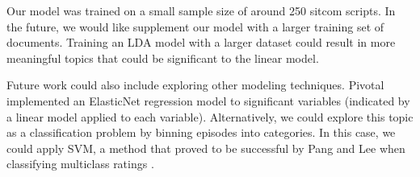 \documentclass{sig-alternate-05-2015}
\begin{document}
Our model was trained on a small sample size of around 250 sitcom scripts. In the future, we would like supplement our model with a larger training set of documents. Training an LDA model with a larger dataset could result in more meaningful topics that could be significant to the linear model.

Future work could also include exploring other modeling techniques. Pivotal implemented an ElasticNet regression model to significant variables (indicated by a linear model applied to each variable). Alternatively, we could explore this topic as a classification problem by binning episodes into categories. In this case, we could apply SVM, a method that proved to be successful by Pang and Lee when classifying multiclass ratings \cite{Pang:2005:SSE:1219840.1219855}.





\balancecolumns %
\end{document}
